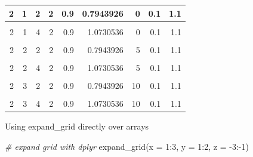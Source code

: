 \documentclass[
]{book}
\newenvironment{Shaded}{\begin{snugshade}}{\end{snugshade}}
\newcommand{\AttributeTok}[1]{\textcolor[rgb]{0.77,0.63,0.00}{#1}}
\newcommand{\CommentTok}[1]{\textcolor[rgb]{0.56,0.35,0.01}{\textit{#1}}}
\newcommand{\DecValTok}[1]{\textcolor[rgb]{0.00,0.00,0.81}{#1}}
\newcommand{\FunctionTok}[1]{\textcolor[rgb]{0.00,0.00,0.00}{#1}}
\newcommand{\NormalTok}[1]{#1}
\newcommand{\SpecialCharTok}[1]{\textcolor[rgb]{0.00,0.00,0.00}{#1}}
\begin{document}
\begin{table}[!h]
\begin{tabular}{r|r|r|r|r|r|r|r|r}
\hline
2 & 1 & 2 & 2 & 0.9 & 0.7943926 & 0 & 0.1 & 1.1\\
\hline
\cellcolor{gray!6}{2} & \cellcolor{gray!6}{1} & \cellcolor{gray!6}{3} & \cellcolor{gray!6}{2} & \cellcolor{gray!6}{0.9} & \cellcolor{gray!6}{4.7526783} & \cellcolor{gray!6}{0} & \cellcolor{gray!6}{0.1} & \cellcolor{gray!6}{1.1}\\
\hline
2 & 1 & 4 & 2 & 0.9 & 1.0730536 & 0 & 0.1 & 1.1\\
\hline
\cellcolor{gray!6}{2} & \cellcolor{gray!6}{2} & \cellcolor{gray!6}{1} & \cellcolor{gray!6}{2} & \cellcolor{gray!6}{0.9} & \cellcolor{gray!6}{0.5709374} & \cellcolor{gray!6}{5} & \cellcolor{gray!6}{0.1} & \cellcolor{gray!6}{1.1}\\
\hline
2 & 2 & 2 & 2 & 0.9 & 0.7943926 & 5 & 0.1 & 1.1\\
\hline
\cellcolor{gray!6}{2} & \cellcolor{gray!6}{2} & \cellcolor{gray!6}{3} & \cellcolor{gray!6}{2} & \cellcolor{gray!6}{0.9} & \cellcolor{gray!6}{4.7526783} & \cellcolor{gray!6}{5} & \cellcolor{gray!6}{0.1} & \cellcolor{gray!6}{1.1}\\
\hline
2 & 2 & 4 & 2 & 0.9 & 1.0730536 & 5 & 0.1 & 1.1\\
\hline
\cellcolor{gray!6}{2} & \cellcolor{gray!6}{3} & \cellcolor{gray!6}{1} & \cellcolor{gray!6}{2} & \cellcolor{gray!6}{0.9} & \cellcolor{gray!6}{0.5709374} & \cellcolor{gray!6}{10} & \cellcolor{gray!6}{0.1} & \cellcolor{gray!6}{1.1}\\
\hline
2 & 3 & 2 & 2 & 0.9 & 0.7943926 & 10 & 0.1 & 1.1\\
\hline
\cellcolor{gray!6}{2} & \cellcolor{gray!6}{3} & \cellcolor{gray!6}{3} & \cellcolor{gray!6}{2} & \cellcolor{gray!6}{0.9} & \cellcolor{gray!6}{4.7526783} & \cellcolor{gray!6}{10} & \cellcolor{gray!6}{0.1} & \cellcolor{gray!6}{1.1}\\
\hline
2 & 3 & 4 & 2 & 0.9 & 1.0730536 & 10 & 0.1 & 1.1\\
\hline
\end{tabular}
\end{table}

Using expand\_grid directly over arrays

\begin{Shaded}
\begin{Highlighting}[]
\CommentTok{\# expand grid with dplyr}
\FunctionTok{expand\_grid}\NormalTok{(}\AttributeTok{x =} \DecValTok{1}\SpecialCharTok{:}\DecValTok{3}\NormalTok{, }\AttributeTok{y =} \DecValTok{1}\SpecialCharTok{:}\DecValTok{2}\NormalTok{, }\AttributeTok{z =} \SpecialCharTok{{-}}\DecValTok{3}\SpecialCharTok{:{-}}\DecValTok{1}\NormalTok{)}
\end{Highlighting}
\end{Shaded}
\end{document}
